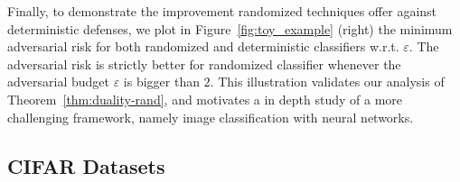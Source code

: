 Finally, to demonstrate the improvement randomized techniques offer against deterministic defenses, we plot in Figure~\ref{fig:toy_example} (right) the minimum adversarial risk for both randomized and deterministic classifiers w.r.t. $\varepsilon$. The adversarial risk is strictly better for randomized classifier whenever the adversarial budget $\varepsilon$ is bigger than $2$. This illustration validates our analysis of Theorem~\ref{thm:duality-rand}, and motivates a in depth study of a more challenging framework, namely image classification with neural networks.


\subsection{CIFAR Datasets}



  
